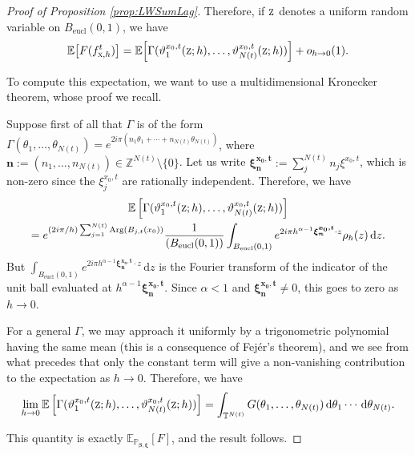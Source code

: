 \documentclass[JEP,XML,SOM,Unicode,published]{cedram}
\newcommand{\NoChangel}[1]{%
\expandafter\let\csname old\string#1\endcsname=#1
\let#1=\relax
\newcommand{#1}{\mathcode`l="716C\csname old\string#1\endcsname\mathcode`l="7160 }%
}
\newcommand{\rd}{\,\mathrm{d}}
\newcommand{\eucl}{\mathrm{eucl}}
\DeclareMathOperator{\Arg}{Arg}
\theoremstyle{plain}
\theoremstyle{definition}
\newcommand{\E}{\mathbb{E}}
\newcommand{\Z}{\mathbb{Z}}
\newcommand{\T}{\mathbb{T}}
\DeclareMathOperator{\Vol}{Vol}\NoChangel{\Vol}
\begin{document}
\begin{proof}[Proof of Proposition \ref{prop:LWSumLag}]
Therefore, if $\textsc{z}$ denotes a uniform random variable on $B_{\eucl}(0,1)$, we have
\[
\E \bigl[F(f^t_{\textsc{x},h})\bigr] =\E \Bigl[ \Gamma(\vartheta_1^{x_0,t}(\textsc{z}; h),\dots,\vartheta_{N(t)}^{x_0,t}(\textsc{z}; h))\Bigr] + o_{h\to 0}(1).
\]

To compute this expectation, we want to use a multidimensional Kronecker theorem, whose proof we recall.

Suppose first of all that $\Gamma$ is of the form $\Gamma (\theta_1,\dots, \theta_{N(t)})= e^{2i\pi(n_1\theta_1+\cdots+n_{N(t)}\theta_{N(t)})}$, where $\boldsymbol{n}:=(n_1,\dots,n_{N(t)})\in\Z^{N(t)}\setminus\{0\}$. Let us write $\boldsymbol{\xi^{x_0,t}_n}:=\sum_j^{N(t)}n_j\xi^{x_0,t}$, which is non-zero since the $\xi^{x_0,t}_j$ are rationally independent. Therefore, we have
\begin{multline*}
\E \left[ \Gamma(\vartheta_1^{x_0,t}(\textsc{z}; h),\dots,\vartheta_{N(t)}^{x_0,t}(\textsc{z}; h))\right]\\
=e^{(2i\pi/h)\sum_{j=1}^{N(t)} \Arg(B_{j,t}(x_0))} \frac{1}{\Vol(B_{\eucl}(0,1))}\int_{B_{\eucl}(0,1)}e^{2i\pi h^{\alpha-1}\boldsymbol{\xi^{x_0,t}_n}\cdot z}\rho_h(z)\rd z.
\end{multline*}
But $\int_{B_{\eucl}(0,1)}e^{2i\pi h^{\alpha-1}\boldsymbol{\xi^{x_0,t}_n}\cdot z}\rd z$ is the Fourier transform of the indicator of the unit ball evaluated at $h^{\alpha-1}\boldsymbol{\xi^{x_0,t}_n}$. Since $\alpha<1$ and $\boldsymbol{\xi^{x_0,t}_n}\neq 0$, this goes to zero as $h\to 0$.

For a general $\Gamma$, we may approach it uniformly by a trigonometric polynomial having the same mean (this is a consequence of Fejér's theorem), and we see from what precedes that only the constant term will give a non-vanishing contribution to the expectation as $h\to 0$. Therefore, we have
\[
\lim\limits_{h\to 0} \E \left[ \Gamma(\vartheta_1^{x_0,t}(\textsc{z}; h),\dots,\vartheta_{N(t)}^{x_0,t}(\textsc{z}; h))\right] = \int_{\T^{N(t)}}G(\theta_1,\dots, \theta_{N(t)}) \rd \theta_1 \cdots\rd \theta_{N(t)}.
\]

This quantity is exactly $\mathbb{E}_{\mathbb{P}_{\boldsymbol{\beta},\boldsymbol{\xi}}}\left[ F\right]$, and the result follows.
\end{proof}
\end{document}
